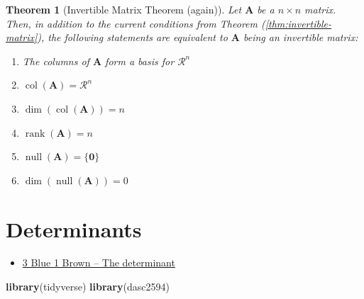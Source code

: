 \documentclass[
]{book}
\newenvironment{Shaded}{\begin{snugshade}}{\end{snugshade}}
\newcommand{\KeywordTok}[1]{\textcolor[rgb]{0.13,0.29,0.53}{\textbf{#1}}}
\newcommand{\NormalTok}[1]{#1}
\providecommand{\tightlist}{%
  \setlength{\itemsep}{0pt}\setlength{\parskip}{0pt}}
\newtheorem{theorem}{Theorem}[chapter]
\theoremstyle{definition}
\theoremstyle{definition}
\theoremstyle{definition}
\theoremstyle{definition}
\theoremstyle{remark}
\begin{document}
\begin{theorem}[Invertible Matrix Theorem (again)]

Let \(\mathbf{A}\) be a \(n \times n\) matrix. Then, in addition to the current conditions from Theorem (\ref{thm:invertible-matrix}), the following statements are equivalent to \(\mathbf{A}\) being an invertible matrix:

\begin{enumerate}
\def\labelenumi{\alph{enumi})}
\item
  The columns of \(\mathbf{A}\) form a basis for \(\mathcal{R}^n\)
\item
  \(\operatorname{col}(\mathbf{A}) = \mathcal{R}^n\)
\item
  \(\operatorname{dim}(\operatorname{col}(\mathbf{A})) = n\)
\item
  \(\operatorname{rank}(\mathbf{A}) = n\)
\item
  \(\operatorname{null}(\mathbf{A}) = \{\mathbf{0}\}\)
\item
  \(\operatorname{dim}(\operatorname{null}(\mathbf{A})) = 0\)
\end{enumerate}

\end{theorem}

\hypertarget{determinants}{%
\chapter{Determinants}\label{determinants}}

\begin{itemize}
\tightlist
\item
  \href{https://www.3blue1brown.com/lessons/determinant}{3 Blue 1 Brown -- The determinant}
\end{itemize}

\begin{Shaded}
\begin{Highlighting}[]
\KeywordTok{library}\NormalTok{(tidyverse)}
\KeywordTok{library}\NormalTok{(dasc2594)}
\end{Highlighting}
\end{Shaded}
\end{document}
